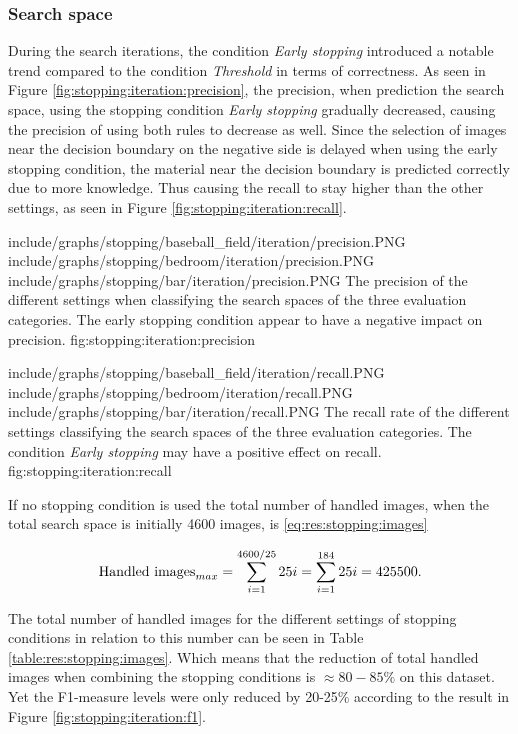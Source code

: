 \subsubsection{Search space}
\label{sec:result:stopping:iterations}
During the search iterations, the condition \emph{Early stopping} introduced a notable trend compared to the condition \emph{Threshold} in terms of correctness. As seen in Figure \ref{fig:stopping:iteration:precision}, the precision, when prediction the search space, using the stopping condition \emph{Early stopping} gradually decreased, causing the precision of using both rules to decrease as well. Since the selection of images near the decision boundary on the negative side is delayed when using the early stopping condition, the material near the decision boundary is predicted correctly due to more knowledge. Thus causing the recall to stay higher than the other settings, as seen in Figure \ref{fig:stopping:iteration:recall}.

\tripfigurenear
{include/graphs/stopping/baseball_field/iteration/precision.PNG}
{include/graphs/stopping/bedroom/iteration/precision.PNG}
{include/graphs/stopping/bar/iteration/precision.PNG}
{The precision of the different settings when classifying the search spaces of the three evaluation categories. The early stopping condition appear to have a negative impact on precision.}
{fig:stopping:iteration:precision}

\tripfigurenear
{include/graphs/stopping/baseball_field/iteration/recall.PNG}
{include/graphs/stopping/bedroom/iteration/recall.PNG}
{include/graphs/stopping/bar/iteration/recall.PNG}
{The recall rate of the different settings classifying the search spaces of the three evaluation categories. The condition \emph{Early stopping} may have a positive effect on recall.}
{fig:stopping:iteration:recall}

If no stopping condition is used the total number of handled images, when the total search space is initially 4600 images, is \ref{eq:res:stopping:images}

\begin{equation}
\label{eq:res:stopping:images}
\textnormal{Handled images}_{max} = \sum_{i=1}^{4600/25}{25i} =\sum_{i=1}^{184}{25i} = 425500.
\end{equation}

The total number of handled images for the different settings of stopping conditions in relation to this number can be seen in Table \ref{table:res:stopping:images}. Which means that the reduction of total handled images when combining the stopping conditions is $\approx80-85\%$ on this dataset. Yet the F1-measure levels were only reduced by 20-25\% according to the result in Figure \ref{fig:stopping:iteration:f1}. 

